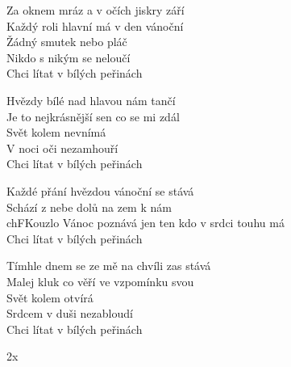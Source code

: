 
\ve{}
Za oknem mráz a v očích jiskry září \\
Každý roli hlavní má v den vánoční \\
Žádný smutek nebo pláč\\
Nikdo s nikým se neloučí\\
Chci lítat v bílých peřinách

\ve{}
Hvězdy bílé nad hlavou nám tančí\\
Je to nejkrásnější sen co se mi zdál\\
Svět kolem nevnímá\\
V noci oči nezamhouří\\
Chci lítat v bílých peřinách

\cho{}
Každé přání hvězdou vánoční se stává\\
Schází z nebe dolů na zem k nám\\
ch{F}Kouzlo Vánoc poznává jen ten kdo v srdci touhu má\\
Chci lítat v bílých peřinách

\ve{}
Tímhle dnem se ze mě na chvíli zas stává\\
Malej kluk co věří ve vzpomínku svou\\
Svět kolem otvírá\\
Srdcem v duši nezabloudí\\
Chci lítat v bílých peřinách

\cho{}
2x

\esong{}

